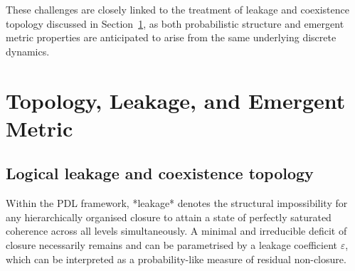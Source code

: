 \documentclass[11pt,a4paper]{article}
\begin{document}
These challenges are closely linked to the treatment of leakage and coexistence topology discussed in Section~\ref{sec:topology_metric}, as both probabilistic structure and emergent metric properties are anticipated to arise from the same underlying discrete dynamics.

\section{Topology, Leakage, and Emergent Metric}
\label{sec:topology_metric}

\subsection{Logical leakage and coexistence topology}
\label{subsec:leakage_coexistence}

Within the PDL framework, *leakage* denotes the structural impossibility for any hierarchically organised closure to attain a state of perfectly saturated coherence across all levels simultaneously. A minimal and irreducible deficit of closure necessarily remains and can be parametrised by a leakage coefficient $\varepsilon$, which can be interpreted as a probability-like measure of residual non-closure.\cite{Topological_Reformulation_PDL_2026} 
\end{document}

